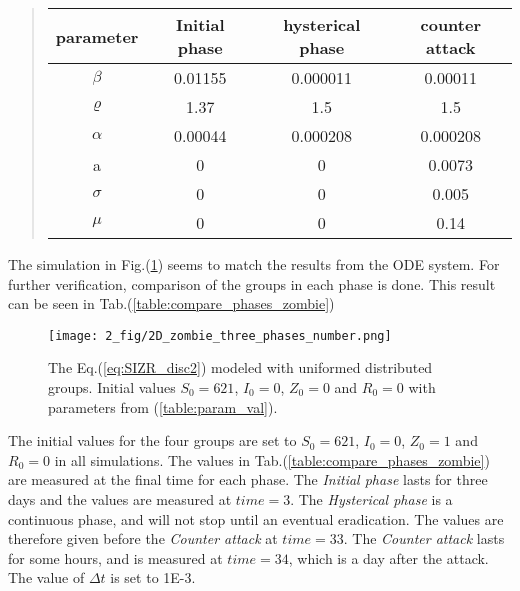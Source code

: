 \documentclass[%
twoside,                 %
final,                   %
chapterprefix=true,      %
open=right               %
10pt]{book}
\begin{document}
\label{table:param_val}

\begin{quote}
\begin{tabular}{cccc}
\hline
\multicolumn{1}{c}{ parameter } & \multicolumn{1}{c}{ Initial phase } & \multicolumn{1}{c}{ hysterical phase } & \multicolumn{1}{c}{ counter attack } \\
\hline
$\beta$   & 0.01155       & 0.000011         & 0.00011        \\
$\varrho$ & 1.37          & 1.5              & 1.5            \\
$\alpha$  & 0.00044       & 0.000208         & 0.000208       \\
a         & 0             & 0                & 0.0073         \\
$\sigma$  & 0             & 0                & 0.005          \\
$\mu$     & 0             & 0                & 0.14           \\
\hline
\end{tabular}
\end{quote}

\noindent
The simulation in Fig.(\ref{fig:zombie_three_number}) seems to match the results from the ODE system. For further verification, comparison of the groups in each phase is done. This result can be seen in Tab.(\ref{table:compare_phases_zombie}) 


\begin{figure}[ht]
  \centerline{\texttt{[image: 2\_fig/2D\_zombie\_three\_phases\_number.png]}}
  \caption{
  \label{fig:zombie_three_number} The Eq.(\ref{eq:SIZR_disc2}) modeled with uniformed distributed groups. Initial values $S_0 = 621$, $I_0 = 0$, $Z_0 = 0$ and  $R_0 = 0$ with parameters from (\ref{table:param_val}).
  }
\end{figure}




\vspace{3mm}




\vspace{3mm}


The initial values for the four groups are set to $S_0=621$, $I_0=0$, $Z_0=1$ and $R_0= 0$ in all simulations. The values in Tab.(\ref{table:compare_phases_zombie}) are measured at the final time for each phase. The \emph{Initial phase} lasts for three days and the values are measured at $time=3$. The \emph{Hysterical phase} is a continuous phase, and will not stop until an eventual eradication. The values are therefore given before the \emph{Counter attack} at $time=33$. The \emph{Counter attack} lasts for some hours, and is measured at $time=34$, which is a day after the attack. The value of $\Delta t$ is set to 1E-3. 
\end{document}
